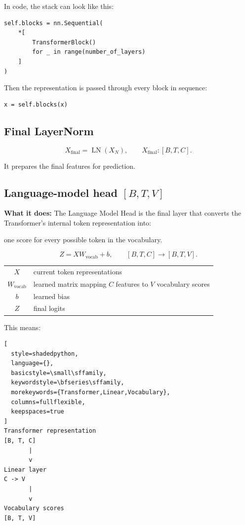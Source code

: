 In code, the stack can look like this:
\begin{lstlisting}[style=shadedpython]
self.blocks = nn.Sequential(
    *[
        TransformerBlock()
        for _ in range(number_of_layers)
    ]
)
\end{lstlisting}
Then the representation is passed through every block in sequence:
\begin{lstlisting}[style=shadedpython]
x = self.blocks(x)
\end{lstlisting}



\subsection{Final LayerNorm}

\[
  X_{\text{final}}=\operatorname{LN}(X_N),
  \qquad
  X_{\text{final}}:[B,T,C].
\]

It prepares the final features for prediction.

\subsection{Language-model head \( [B,T,V] \)}

\textbf{What it does:} The Language Model Head is the final layer that converts the Transformer's internal token representation into:

one score for every possible token in the vocabulary.

\[
  Z=XW_{\text{vocab}}+b,
  \qquad
  [B,T,C]\longrightarrow[B,T,V].
\]

\begin{center}
\begin{tabular}{@{}cl@{}}
  \(X\) & current token representations \\
  \(W_{\text{vocab}}\) & learned matrix mapping \(C\) features to \(V\) vocabulary scores \\
  \(b\) & learned bias \\
  \(Z\) & final logits
\end{tabular}
\end{center}



This means:
\begin{lstlisting}[
  style=shadedpython,
  language={},
  basicstyle=\small\sffamily,
  keywordstyle=\bfseries\sffamily,
  morekeywords={Transformer,Linear,Vocabulary},
  columns=fullflexible,
  keepspaces=true
]
Transformer representation
[B, T, C]
       |
       v
Linear layer
C -> V
       |
       v
Vocabulary scores
[B, T, V]
\end{lstlisting}



